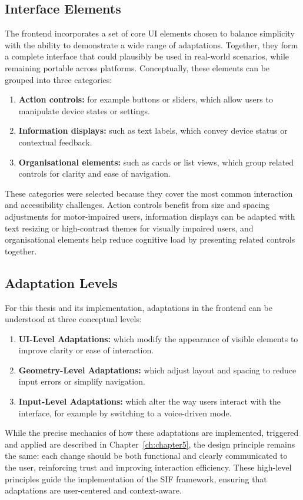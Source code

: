 \subsection{Interface Elements}
The frontend incorporates a set of core UI elements chosen to balance simplicity with the ability to demonstrate a wide range of adaptations. Together, they form a complete interface that could plausibly be used in real-world scenarios, while remaining portable across platforms. Conceptually, these elements can be grouped into three categories:
\begin{enumerate}
    \item \textbf{Action controls:} for example buttons or sliders, which allow users to manipulate device states or settings.
    \item \textbf{Information displays:} such as text labels, which convey device status or contextual feedback.
    \item \textbf{Organisational elements:} such as cards or list views, which group related controls for clarity and ease of navigation.
\end{enumerate}
These categories were selected because they cover the most common interaction and accessibility challenges. Action controls benefit from size and spacing adjustments for motor-impaired users, information displays can be adapted with text resizing or high-contrast themes for visually impaired users, and organisational elements help reduce cognitive load by presenting related controls together.

\subsection{Adaptation Levels}
For this thesis and its implementation, adaptations in the frontend can be understood at three conceptual levels:
\begin{enumerate}
    \item \textbf{UI-Level Adaptations:} which modify the appearance of visible elements to improve clarity or ease of interaction.
    \item \textbf{Geometry-Level Adaptations:} which adjust layout and spacing to reduce input errors or simplify navigation.
    \item \textbf{Input-Level Adaptations:} which alter the way users interact with the interface, for example by switching to a voice-driven mode.
\end{enumerate}
While the precise mechanics of how these adaptations are implemented, triggered and applied are described in Chapter~\ref{ch:chapter5}, the design principle remains the same: each change should be both functional and clearly communicated to the user, reinforcing trust and improving interaction efficiency. These high-level principles guide the implementation of the SIF framework, ensuring that adaptations are user-centered and context-aware.

